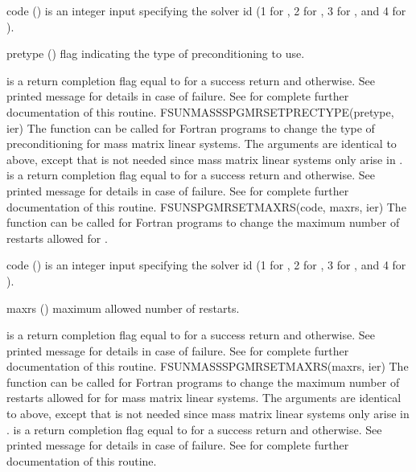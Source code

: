 {
  \begin{args}[pretype]
  \item[code] ()
    is an integer input specifying the solver id (1 for {\cvode}, 2
    for {\ida}, 3 for {\kinsol}, and 4 for {\arkode}).
  \item[pretype] ()
    flag indicating the type of preconditioning to use.
  \end{args}
}
{
   is a  return completion flag equal to  for a success
  return and  otherwise. See printed message for details in case
  of failure.
}
{
  See  for complete further documentation of
  this routine.
}
%
%
{
  FSUNMASSSPGMRSETPRECTYPE(pretype, ier)
}
{
  The function  can be called for Fortran
  programs to change the type of preconditioning for mass matrix
  linear systems.
}
{
  The arguments are identical to  above, except that
   is not needed since mass matrix linear systems only arise
  in {\arkode}.
}
{
   is a  return completion flag equal to  for a success
  return and  otherwise. See printed message for details in case
  of failure.
}
{
  See  for complete further documentation of
  this routine.
}
%
%
{
  FSUNSPGMRSETMAXRS(code, maxrs, ier)
}
{
  The function  can be called for Fortran programs
  to change the maximum number of restarts allowed for {\spgmr}.
}
{
  \begin{args}[maxrs]
  \item[code] ()
    is an integer input specifying the solver id (1 for {\cvode}, 2
    for {\ida}, 3 for {\kinsol}, and 4 for {\arkode}).
  \item[maxrs] ()
    maximum allowed number of restarts.
  \end{args}
}
{
   is a  return completion flag equal to  for a success
  return and  otherwise. See printed message for details in case
  of failure.
}
{
  See  for complete further
  documentation of this routine.
}
%
%
{
  FSUNMASSSPGMRSETMAXRS(maxrs, ier)
}
{
  The function  can be called for Fortran
  programs to change the maximum number of restarts allowed for
  {\spgmr} for mass matrix linear systems.
}
{
  The arguments are identical to  above, except that
   is not needed since mass matrix linear systems only arise
  in {\arkode}.
}
{
   is a  return completion flag equal to  for a success
  return and  otherwise. See printed message for details in case
  of failure.
}
{
  See  for complete further
  documentation of this routine.
}
%
%

